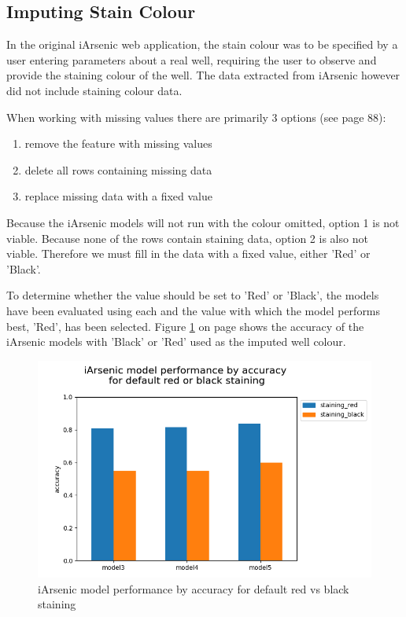 \subsection{Imputing Stain Colour}

In the original iArsenic web application, the stain colour was to be specified by a user entering parameters about a real well, requiring the user to observe and provide the staining colour of the well. The data extracted from iArsenic however did not include staining colour data. 

When working with missing values there are primarily 3 options (see \cite{Aurélien2017} page 88): 

\begin{enumerate}
    \item remove the feature with missing values
    \item delete all rows containing missing data
    \item replace missing data with a fixed value
\end{enumerate}

Because the iArsenic models will not run with the colour omitted, option 1 is not viable. Because none of the rows contain staining data, option 2 is also not viable. Therefore we must fill in the data with a fixed value, either 'Red' or 'Black'.

To determine whether the value should be set to 'Red' or 'Black', the models have been evaluated using each and the value with which the model performs best, 'Red', has been selected. Figure \ref{fig:x ia_model_black_red_accuracy} on page \pageref{fig:x ia_model_black_red_accuracy} shows the accuracy of the iArsenic models with 'Black' or 'Red' used as the imputed well colour.

\begin{figure}[h]
    \centering
    \includegraphics[scale=0.55]{figures/ia_model_black_red_accuracy.png} 
    \caption{iArsenic model performance by accuracy for default red vs black staining}
    \label{fig:x ia_model_black_red_accuracy}
\end{figure}

